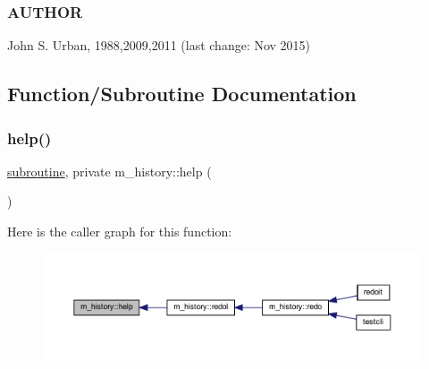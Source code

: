 \subsubsection*{A\+U\+T\+H\+OR}

John S. Urban, 1988,2009,2011 (last change\+: Nov 2015) 

\subsection{Function/\+Subroutine Documentation}
\mbox{\label{namespacem__history_a8d0830530f10435242fa57853baad282}} 
\subsubsection{\texorpdfstring{help()}{help()}}
{\footnotesize\ttfamily \hyperlink{M__stopwatch_83_8txt_acfbcff50169d691ff02d4a123ed70482}{subroutine}, private m\+\_\+history\+::help (\begin{DoxyParamCaption}{ }\end{DoxyParamCaption})\hspace{0.3cm}{\ttfamily [private]}}

Here is the caller graph for this function\+:
\nopagebreak
\begin{figure}[H]
\begin{center}
\leavevmode
\includegraphics[width=350pt]{namespacem__history_a8d0830530f10435242fa57853baad282_icgraph}
\end{center}
\end{figure}
\mbox{\label{namespacem__history_ac181d59688bc06d4ba7465841721e766}} 
